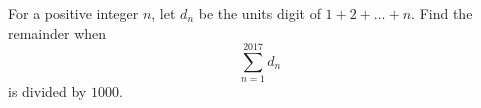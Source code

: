 For a positive integer $n$,  let $d_n$ be the units digit of $1 + 2 + \dots + n$. Find the remainder when\[\sum_{n=1}^{2017} d_n\]is divided by $1000$.